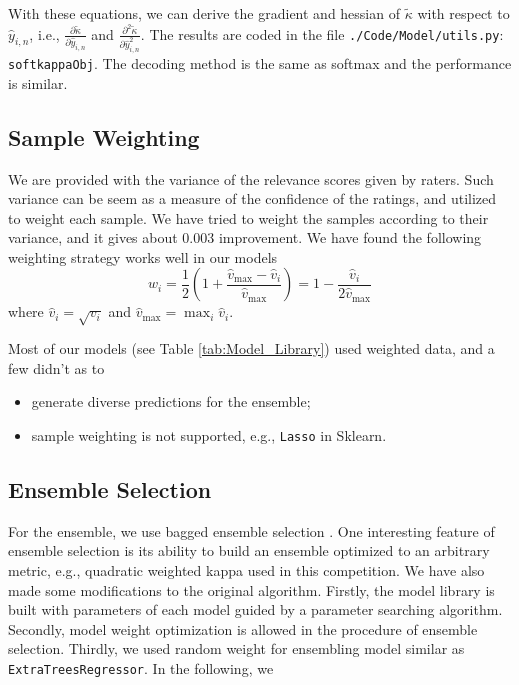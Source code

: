 \documentclass[12pt]{article}
\begin{document}
With these equations, we can derive the gradient and hessian of $\tilde{\kappa}$ with respect to $\hat{y}_{i,n}$, i.e., $\frac{\partial \tilde{\kappa}}{\partial \hat{y}_{i,n}}$ and $\frac{\partial^2 \tilde{\kappa}}{\partial \hat{y}_{i,n}^2}$. The results are coded in the file \texttt{./Code/Model/utils.py}: \texttt{softkappaObj}. The decoding method is the same as softmax and the performance is similar.

\subsection{Sample Weighting}
We are provided with the variance of the relevance scores given by raters. Such variance can be seem as a measure of the confidence of the ratings, and utilized to weight each sample. We have tried to weight the samples according to their variance, and it gives about 0.003 improvement. We have found the following weighting strategy works well in our models
\begin{equation}
w_i = \frac{1}{2}(1 + \frac{\hat{v}_{\max} - \hat{v}_i}{\hat{v}_{\max}})=1-\frac{\hat{v}_i}{2\hat{v}_{\max}}
\end{equation}
where $\hat{v}_i = \sqrt{v_i}$ and $\hat{v}_{\max} = \max_{i} \hat{v}_i$.

Most of our models (see Table \ref{tab:Model_Library}) used weighted data, and a few didn't as to
\begin{itemize}
\item generate diverse predictions for the ensemble;
\item sample weighting is not supported, e.g., \texttt{Lasso} in Sklearn.
\end{itemize}

\subsection{Ensemble Selection}
For the ensemble, we use bagged ensemble selection \cite{ensemble_selection}. One interesting feature of ensemble selection is its ability to build an ensemble optimized to an arbitrary metric, e.g., quadratic weighted kappa used in this competition. We have also made some modifications to the original algorithm. Firstly, the model library is built with parameters of each model guided by a parameter searching algorithm. Secondly, model weight optimization is allowed in the procedure of ensemble selection. Thirdly, we used random weight for ensembling model similar as \texttt{ExtraTreesRegressor}. In the following, we
\end{document}
